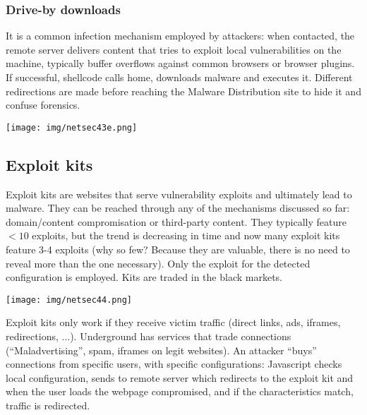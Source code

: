 \documentclass[a4paper, 10pt, titlepage]{article}
\begin{document}
\subsubsection*{Drive-by downloads} %
It is a common infection mechanism employed by attackers: when contacted, the remote server delivers content that tries to exploit local vulnerabilities on the machine, typically buffer overflows against common browsers or browser plugins. If successful, shellcode calls home, downloads malware and executes it. Different redirections are made before reaching the Malware Distribution site to hide it and confuse forensics.
\begin{center}
	\texttt{[image: img/netsec43e.png]}
\end{center}

\subsection{Exploit kits}
Exploit kits are websites that serve vulnerability exploits and ultimately lead to malware. They can be reached through any of the mechanisms discussed so far: domain/content compromisation or third-party content. They typically feature $<10$ exploits, but the trend is decreasing in time and now many exploit kits feature 3-4 exploits (why so few? Because they are valuable, there is no need to reveal more than the one necessary). Only the exploit for the detected configuration is employed. Kits are traded in the black markets.
\begin{center}
	\texttt{[image: img/netsec44.png]}
\end{center}
Exploit kits only work if they receive victim traffic (direct links, ads, iframes, redirections, ...). Underground has services that trade connections (“Maladvertising”, spam, iframes on legit websites). An attacker “buys” connections from specific users, with specific configurations: Javascript checks local configuration, sends to remote server which redirects to the exploit kit and when the user loads the webpage compromised, and if the characteristics match, traffic is redirected.
\end{document}
